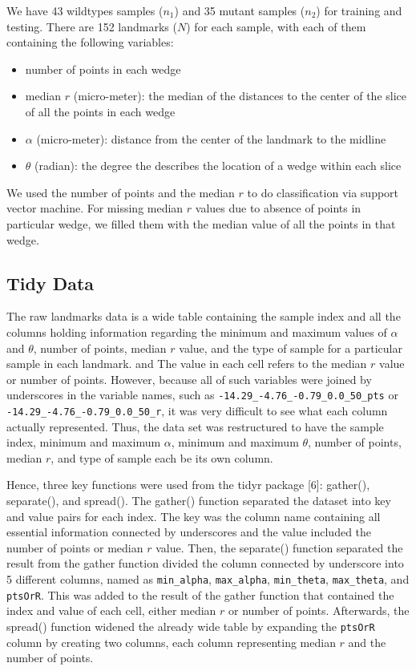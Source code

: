 \documentclass[10pt,letterpaper]{article}
\providecommand{\tightlist}{%
  \setlength{\itemsep}{0pt}\setlength{\parskip}{0pt}}
\begin{document}
We have 43 wildtypes samples (\(n_1\)) and 35 mutant samples (\(n_2\))
for training and testing. There are 152 landmarks (\(N\)) for each
sample, with each of them containing the following variables:

\begin{itemize}
\tightlist
\item
  number of points in each wedge
\item
  median \(r\) (micro-meter): the median of the distances to the center
  of the slice of all the points in each wedge
\item
  \(\alpha\) (micro-meter): distance from the center of the landmark to
  the midline
\item
  \(\theta\) (radian): the degree the describes the location of a wedge
  within each slice
\end{itemize}

We used the number of points and the median \(r\) to do classification
via support vector machine. For missing median \(r\) values due to
absence of points in particular wedge, we filled them with the median
value of all the points in that wedge.

\subsection{Tidy Data}\label{tidy-data}

The raw landmarks data is a wide table containing the sample index and
all the columns holding information regarding the minimum and maximum
values of \(\alpha\) and \(\theta\), number of points, median \(r\)
value, and the type of sample for a particular sample in each landmark.
and The value in each cell refers to the median \(r\) value or number of
points. However, because all of such variables were joined by
underscores in the variable names, such as
\texttt{-14.29\_-4.76\_-0.79\_0.0\_50\_pts} or
\texttt{-14.29\_-4.76\_-0.79\_0.0\_50\_r}, it was very difficult to see
what each column actually represented. Thus, the data set was
restructured to have the sample index, minimum and maximum \(\alpha\),
minimum and maximum \(\theta\), number of points, median \(r\), and type
of sample each be its own column.

Hence, three key functions were used from the tidyr package {[}6{]}:
gather(), separate(), and spread(). The gather() function separated the
dataset into key and value pairs for each index. The key was the column
name containing all essential information connected by underscores and
the value included the number of points or median \(r\) value. Then, the
separate() function separated the result from the gather function
divided the column connected by underscore into 5 different columns,
named as \texttt{min\_alpha}, \texttt{max\_alpha}, \texttt{min\_theta},
\texttt{max\_theta}, and \texttt{ptsOrR}. This was added to the result
of the gather function that contained the index and value of each cell,
either median \(r\) or number of points. Afterwards, the spread()
function widened the already wide table by expanding the \texttt{ptsOrR}
column by creating two columns, each column representing median \(r\)
and the number of points.
\end{document}
